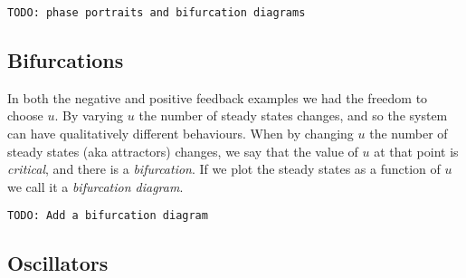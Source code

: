 \documentclass[a4paper]{article}
\newcommand{\todo}[1]{\texttt{TODO: #1}}
\theoremstyle{plain}
\theoremstyle{definition}
\theoremstyle{remark}
\begin{document}
\todo{phase portraits and bifurcation diagrams}

\subsection{Bifurcations}

In both the negative and positive feedback examples we had the freedom to
choose $u$. By varying $u$ the number of steady states changes, and so the
system can have qualitatively different behaviours. When by changing $u$ the
number of steady states (aka attractors) changes, we say that the value of $u$
at that point is \emph{critical}, and there is a \emph{bifurcation}. If we
plot the steady states as a function of $u$ we call it a \emph{bifurcation
diagram}.

\todo{Add a bifurcation diagram}

\subsection{Oscillators}
\end{document}
